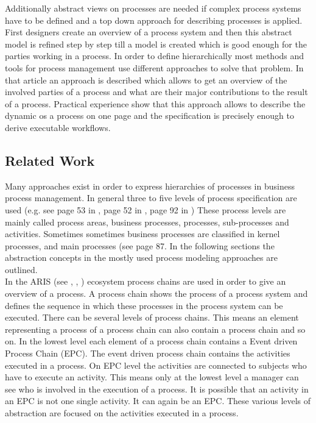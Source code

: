 Additionally abstract views on processes are needed if complex process systems have to be defined and a top down approach for describing processes is applied. First designers create an overview of a process system and then this abstract model is refined step by step till a model is created which is good enough for the parties working in a process. In order to define hierarchically most methods and tools for process management use different approaches to solve that problem.
In that article an approach is described which allows to get an overview of the involved parties of a process and what are their major contributions to the result of a process. Practical experience show that this approach allows to describe the dynamic os a process on one page and the specification is precisely enough to derive executable workflows.

\subsection{Related Work}

Many approaches exist in order to express hierarchies of processes in business process management. In general three to five levels of process specification are used (e.g. see page 53 in \cite{book:Worklow-Mod}, page 52 in \cite{book:Prozessmgmt-umsetzen}, page 92 in \cite{book:EnterpriseBPM}) These process levels are mainly called process areas, business processes, processes, sub-processes and activities. Sometimes sometimes business processes are classified in kernel processes, and main processes (see \cite{book:EnterpriseBPM} page 87. 
In the following sections the abstraction concepts in the mostly used process modeling approaches are outlined.\\

In the ARIS (see \cite{book:ARIS}, \cite{book:SAPRoadmap}, \cite{book:EnterpriseBPM}) ecosystem process chains are used in order to give an overview of a process. A process chain shows the process of a process system and defines the sequence in which these processes in the process system can be executed.  There can be several levels of process chains. This means an element representing a process of a process chain can also contain a process chain and so on.  In the lowest level each element of a process chain contains a Event driven Process Chain (EPC). The event driven process chain contains the activities executed in a process. On EPC level the activities are connected to subjects who have to execute an activity. This means only at the lowest level a manager can see who is involved in the execution of a process. It is possible that an activity in an EPC is not one single activity. It can again be an EPC. These various levels of abstraction are focused on the activities executed in a process.\\

